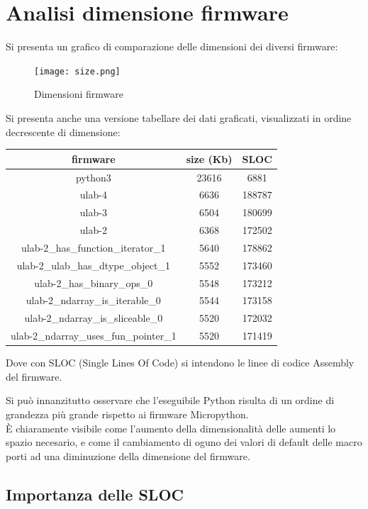 \documentclass[12pt,a4paper]{report}
\begin{document}
\section{Analisi dimensione firmware}


Si presenta un grafico di comparazione delle dimensioni dei diversi firmware:
\begin{figure}
    \centering
    \texttt{[image: size.png]}
    \caption{Dimensioni firmware}
\end{figure}
Si presenta anche una versione tabellare dei dati graficati,
visualizzati in ordine decrescente di dimensione:

\begin{center}
\begin{tabular}{|c | c | c |}
\hline
firmware & size (Kb) & SLOC \\
\hline
python3 & 23616 & 6881 \\
ulab-4 & 6636 & 188787 \\
ulab-3 & 6504 & 180699 \\
ulab-2 & 6368 & 172502 \\
ulab-2\_has\_function\_iterator\_1 & 5640 & 178862 \\
ulab-2\_ulab\_has\_dtype\_object\_1 & 5552 & 173460 \\
ulab-2\_has\_binary\_ops\_0 & 5548 & 173212 \\
ulab-2\_ndarray\_is\_iterable\_0 & 5544 & 173158 \\
ulab-2\_ndarray\_is\_sliceable\_0 & 5520 & 172032 \\
ulab-2\_ndarray\_uses\_fun\_pointer\_1 & 5520 & 171419 \\
\hline
\end{tabular}
\end{center}

Dove con SLOC (Single Lines Of Code) si intendono le linee di codice Assembly del firmware.

Si può innanzitutto osservare che l'eseguibile Python
risulta di un ordine di grandezza più grande rispetto ai firmware
Micropython.\\
È chiaramente visibile come l'aumento della
dimensionalità delle aumenti lo spazio necesario, e come il cambiamento di
oguno dei valori di default delle macro porti ad una diminuzione della dimensione del firmware.

\subsection{Importanza delle SLOC}
\end{document}

